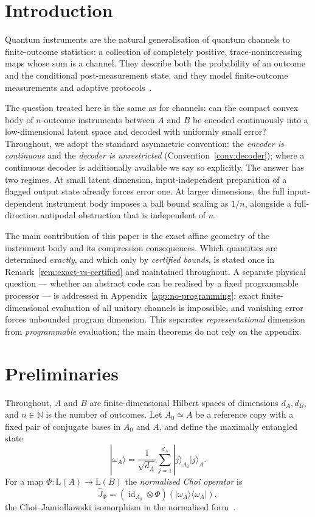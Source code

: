 \documentclass[11pt,a4paper]{article}
\newcommand{\Lin}{\mathrm{L}}
\newcommand{\id}{\operatorname{id}}
\newcommand{\Jhat}{\widehat J}
\begin{document}
\tableofcontents

\section{Introduction}
\label{sec:intro}

Quantum instruments are the natural generalisation of quantum channels to finite-outcome statistics: a collection of completely positive, trace-nonincreasing maps whose sum is a channel. They describe both the probability of an outcome and the conditional post-measurement state, and they model finite-outcome measurements and adaptive protocols~\cite{DaviesLewis1970,Ozawa1984,ChiribellaEtAl2009Instruments}.

The question treated here is the same as for channels: can the compact convex body of $n$-outcome instruments between $A$ and $B$ be encoded continuously into a low-dimensional latent space and decoded with uniformly small error? Throughout, we adopt the standard asymmetric convention: the \emph{encoder is continuous} and the \emph{decoder is unrestricted} (Convention~\ref{conv:decoder}); where a continuous decoder is additionally available we say so explicitly. The answer has two regimes. At small latent dimension, input-independent preparation of a flagged output state already forces error one. At larger dimensions, the full input-dependent instrument body imposes a ball bound scaling as $1/n$, alongside a full-direction antipodal obstruction that is independent of $n$.

The main contribution of this paper is the exact affine geometry of the instrument body and its compression consequences. Which quantities are determined \emph{exactly}, and which only by \emph{certified bounds}, is stated once in Remark~\ref{rem:exact-vs-certified} and maintained throughout. A separate physical question --- whether an abstract code can be realised by a fixed programmable processor --- is addressed in Appendix~\ref{app:no-programming}: exact finite-dimensional evaluation of all unitary channels is impossible, and vanishing error forces unbounded program dimension. This separates \emph{representational} dimension from \emph{programmable} evaluation; the main theorems do not rely on the appendix.

\section{Preliminaries}
\label{sec:prelim}

Throughout, $A$ and $B$ are finite-dimensional Hilbert spaces of dimensions $d_A,d_B$, and $n\in\mathbb N$ is the number of outcomes. Let $A_0\simeq A$ be a reference copy with a fixed pair of conjugate bases in $A_0$ and $A$, and define the maximally entangled state
\[
|\omega_A\rangle=\frac1{\sqrt{d_A}}\sum_{j=1}^{d_A}|j\rangle_{A_0}|j\rangle_A.
\]
For a map $\Phi:\Lin(A)\to\Lin(B)$ the \emph{normalised Choi operator} is
\[
\Jhat_\Phi=(\id_{A_0}\otimes\Phi)(|\omega_A\rangle\langle\omega_A|),
\]
the Choi--Jamio{\l}kowski isomorphism in the normalised form~\cite{Choi1975,Jamiolkowski1972}.
\end{document}
